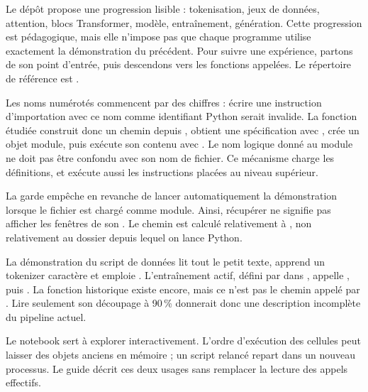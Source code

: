 Le dépôt propose une progression lisible : tokenisation, jeux de données,
attention, blocs Transformer, modèle, entraînement, génération. Cette progression
est pédagogique, mais elle n'impose pas que chaque programme utilise exactement
la démonstration du précédent. Pour suivre une expérience, partons de son point
d'entrée, puis descendons vers les fonctions appelées. Le répertoire de référence
est .

Les noms numérotés commencent par des chiffres : écrire une instruction
d'importation avec ce nom comme identifiant Python serait invalide.
La fonction étudiée construit donc un chemin depuis ,
obtient une spécification avec ,
crée un objet module, puis exécute son contenu avec
. Le nom logique donné au module ne doit pas
être confondu avec son nom de fichier. Ce mécanisme charge les définitions,
et exécute aussi les instructions placées au niveau supérieur.

La garde  empêche en revanche de
lancer automatiquement la démonstration lorsque le fichier est chargé comme
module. Ainsi, récupérer  ne signifie pas afficher les
fenêtres de son . Le chemin est calculé relativement à
, non relativement au dossier depuis lequel on lance Python.

La démonstration  du script de données lit tout le petit texte,
apprend un tokenizer caractère et emploie .
L'entraînement actif, défini par  dans
, appelle
, puis . La fonction historique
 existe encore, mais ce n'est pas le chemin appelé
par . Lire seulement son découpage à 90\,\% donnerait donc une
description incomplète du pipeline actuel.

Le notebook
sert à explorer interactivement. L'ordre d'exécution des cellules peut laisser
des objets anciens en mémoire ; un script relancé repart dans un nouveau
processus. Le guide
décrit ces deux usages sans remplacer la lecture des appels effectifs.

